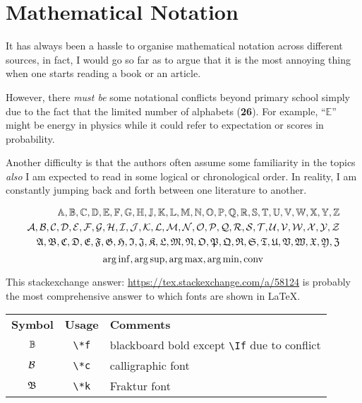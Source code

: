 \documentclass[aos,preprint]{imsart}
\begin{document}

\section{Mathematical Notation}

It has always been a hassle to organise mathematical notation across different sources,
in fact, I would go so far as to argue that it is the most annoying thing
when one starts reading a book or an article.

However, there \textit{must be} some notational conflicts beyond primary school
simply due to the fact that the limited number of alphabets (\textbf{26}).
For example, ``$\mathbb{E}$'' might be energy in physics
while it could refer to expectation or scores in probability.

Another difficulty is that the authors often assume some familiarity in the
topics
\emph{also} I am expected to read in some logical or chronological order.
In reality, I am constantly jumping back and forth between one literature to
another.

\begin{align*}
    \Af, \Bf, \Cf, \Df, \Ef, \Ff, \Gf, \Hf, \Jf, \Kf, \Lf, \Mf, \Nf, \Of, \Pf,
\Qf, \Rf, \Sf, \Tf, \Uf, \Vf, \Wf, \Xf, \Yf, \Zf      \\
    \Ac, \Bc, \Cc, \Dc, \Ec, \Fc, \Gc, \Hc, \Ic, \Jc, \Kc, \Lc, \Mc, \Nc, \Oc,
\Pc, \Qc, \Rc, \Sc, \Tc, \Uc, \Vc, \Wc, \Xc, \Yc, \Zc \\
    \Ak, \Bk, \Ck, \Dk, \Ek, \Fk, \Gk, \Hk, \Ik, \Jk, \Kk, \Lk, \Mk, \Nk, \Ok,
\Pk, \Qk, \Rk, \Sk, \Tk, \Uk, \Vk, \Wk, \Xk, \Yk, \Zk
\end{align*}
$$
    \operatorname*{arg\, inf}, \operatorname*{arg\, sup}, \operatorname*{arg\, max}, \operatorname*{arg\, min}, \mathrm{conv}
$$

This stackexchange answer: \url{https://tex.stackexchange.com/a/58124}
is probably the most comprehensive answer to which fonts are shown in \LaTeX.

\begin{tabular}{ccl}
  \textbf{Symbol} & \textbf{Usage} & \textbf{Comments}                                 \\
  $\mathbb{B}$           & \verb|\*f|     & blackboard bold except \verb|\If| due to conflict \\
  $\mathcal{B}$           & \verb|\*c|     & calligraphic font                                 \\
  $\mathfrak{B}$           & \verb|\*k|     & Fraktur font                                      \\
\end{tabular}
\end{document}
